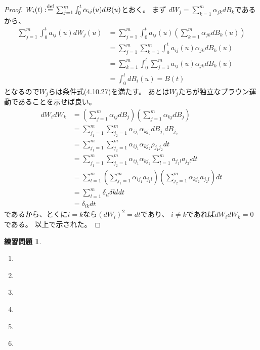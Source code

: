\documentclass[uplatex]{jsarticle}
\theoremstyle{definition}
\newtheorem{prob}[prob]{練習問題}
\def\dfn{:\overset{\mbox{{\scriptsize def}}}{=}}
\begin{document}
\begin{proof}
  \(W_i(t) \dfn \sum_{j=1}^m\int_0^t\alpha_{ij}(u)dB(u)\)とおく。
  まず
  \(dW_j = \sum_{k=1}^m\alpha_{jk}dB_k\)であるから、
  \begin{align*}
    \sum_{j=1}^m\int_0^t a_{ij}(u)dW_j(u)
    &= \sum_{j=1}^m\int_0^t a_{ij}(u)
    \left( \sum_{k=1}^m\alpha_{jk}dB_k(u)\right) \\
    &= \sum_{j=1}^m\sum_{k=1}^m\int_0^t
    a_{ij}(u)\alpha_{jk}dB_k(u) \\
    &= \sum_{k=1}^m\int_0^t
    \sum_{j=1}^m a_{ij}(u)\alpha_{jk}dB_k(u) \\
    &= \int_0^tdB_i(u) = B(t)
  \end{align*}
  となるので\(W_j\)らは条件式(4.10.27)を満たす。
  あとは\(W_j\)たちが独立なブラウン運動であることを示せば良い。
  \begin{align*}
    dW_idW_k
    &= \left( \sum_{j=1}^m\alpha_{ij}dB_j\right)
    \left( \sum_{j=1}^m\alpha_{kj}dB_j\right) \\
    &= \sum_{j_1=1}^m\sum_{j_2=1}^m
    \alpha_{ij_1}\alpha_{kj_2}dB_{j_1}dB_{j_2} \\
    &= \sum_{j_1=1}^m\sum_{j_2=1}^m
    \alpha_{ij_1}\alpha_{kj_2}\rho_{j_1j_2}dt \\
    &= \sum_{j_1=1}^m\sum_{j_2=1}^m
    \alpha_{ij_1}\alpha_{kj_2}\sum_{l=1}^m a_{j_1l}a_{j_2l} dt \\
    &= \sum_{l=1}^m
    \left(\sum_{j_1=1}^m\alpha_{ij_1}a_{j_1l}\right)
    \left(\sum_{j_2=1}^m\alpha_{kj_2}a_{j_2l}\right) dt \\
    &= \sum_{l=1}^m \delta_{il}\delta{kl} dt \\
    &= \delta_{ik} dt
  \end{align*}
  であるから、とくに\(i=k\)なら\((dW_i)^2=dt\)であり、
  \(i\neq k\)であれば\(dW_idW_k=0\)である。
  以上で示された。
\end{proof}


\begin{prob}\label{prob: 4.17}
  \begin{enumerate}
    \item \label{enumi: 4.17-1}
    \item \label{enumi: 4.17-2}
    \item \label{enumi: 4.17-3}
    \item \label{enumi: 4.17-4}
    \item \label{enumi: 4.17-5}
    \item \label{enumi: 4.17-6}
  \end{enumerate}
\end{prob}
\end{document}
